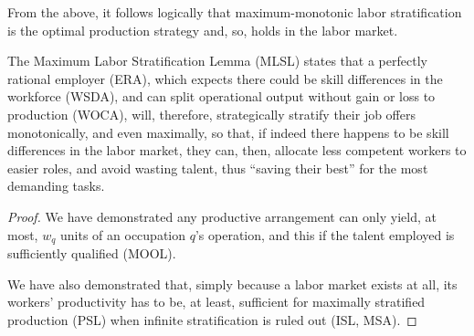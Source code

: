 \documentclass[hidelinks, nonatbib]{elsarticle}
\begin{document}
From the above, it follows logically that maximum-monotonic labor stratification is the optimal production strategy and, so, holds in the labor market.
\begin{lemma}
    \label{mlsl}
    The Maximum Labor Stratification Lemma (MLSL) states that a perfectly rational employer (ERA), which expects there could be skill differences in the workforce (WSDA), and can split operational output without gain or loss to production (WOCA), will, therefore, strategically stratify their job offers monotonically, and even maximally, so that, if indeed there happens to be skill differences in the labor market, they can, then, allocate less competent workers to easier roles, and avoid wasting talent, thus ``saving their best'' for the most demanding tasks.

    \begin{proof}
        We have demonstrated any productive arrangement can only yield, at most, $w_q$ units of an occupation $q$'s operation, and this if the talent employed is sufficiently qualified (MOOL).

        We have also demonstrated that, simply because a labor market exists at all, its workers' productivity has to be, at least, sufficient for maximally stratified production (PSL) when infinite stratification is ruled out (ISL, MSA).


\end{proof}
\end{lemma}
\end{document}
